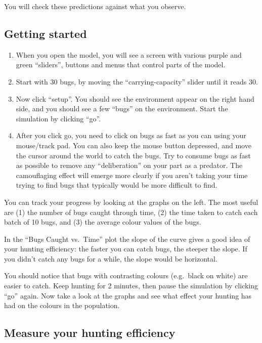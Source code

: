 \documentclass[
  a4paper]{book}
\providecommand{\tightlist}{%
  \setlength{\itemsep}{0pt}\setlength{\parskip}{0pt}}
\begin{document}
You will check these predictions against what you observe.

\subsection{Getting started}\label{getting-started}

\begin{enumerate}
\def\labelenumi{\arabic{enumi}.}
\tightlist
\item
  When you open the model, you will see a screen with various purple and green ``sliders'', buttons and menus that control parts of the model.
\item
  Start with 30 bugs, by moving the ``carrying-capacity'' slider until it reads 30.
\item
  Now click ``setup''. You should see the environment appear on the right hand side, and you should see a few ``bugs'' on the environment. Start the simulation by clicking ``go''.
\item
  After you click go, you need to click on bugs as fast as you can using your mouse/track pad. You can also keep the mouse button depressed, and move the cursor around the world to catch the bugs. Try to consume bugs as fast as possible to remove any ``deliberation'' on your part as a predator. The camouflaging effect will emerge more clearly if you aren't taking your time trying to find bugs that typically would be more difficult to find.
\end{enumerate}

You can track your progress by looking at the graphs on the left. The most useful are (1) the number of bugs caught through time, (2) the time taken to catch each batch of 10 bugs, and (3) the average colour values of the bugs.

In the ``Bugs Caught vs.~Time'' plot the slope of the curve gives a good idea of your hunting efficiency: the faster you can catch bugs, the steeper the slope. If you didn't catch any bugs for a while, the slope would be horizontal.

You should notice that bugs with contrasting colours (e.g.~black on white) are easier to catch. Keep hunting for 2 minutes, then pause the simulation by clicking ``go'' again. Now take a look at the graphs and see what effect your hunting has had on the colours in the population.

\subsection{Measure your hunting efficiency}\label{measure-your-hunting-efficiency}
\end{document}
